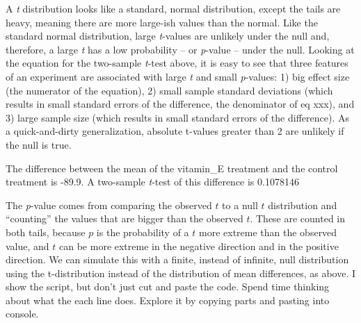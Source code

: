 \documentclass[]{book}
\begin{document}
A \emph{t} distribution looks like a standard, normal distribution,
except the tails are heavy, meaning there are more large-ish values than
the normal. Like the standard normal distribution, large \emph{t}-values
are unlikely under the null and, therefore, a large \emph{t} has a low
probability -- or \emph{p}-value -- under the null. Looking at the
equation for the two-sample \emph{t}-test above, it is easy to see that
three features of an experiment are associated with large \emph{t} and
small \emph{p}-values: 1) big effect size (the numerator of the
equation), 2) small sample standard deviations (which results in small
standard errors of the difference, the denominator of eq xxx), and 3)
large sample size (which results in small standard errors of the
difference). As a quick-and-dirty generalization, absolute t-values
greater than 2 are unlikely if the null is true.

The difference between the mean of the vitamin\_E treatment and the
control treatment is -89.9. A two-sample \emph{t}-test of this
difference is 0.1078146

The \emph{p}-value comes from comparing the observed \(t\) to a null
\(t\) distribution and ``counting'' the values that are bigger than the
observed \(t\). These are counted in both tails, because \(p\) is the
probability of a \(t\) more extreme than the observed value, and \(t\)
can be more extreme in the negative direction and in the positive
direction. We can simulate this with a finite, instead of infinite, null
distribution using the t-distribution instead of the distribution of
mean differences, as above. I show the script, but don't just cut and
paste the code. Spend time thinking about what the each line does.
Explore it by copying parts and pasting into console.
\end{document}
